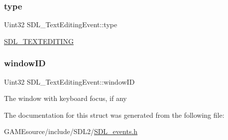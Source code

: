\subsubsection{\texorpdfstring{type}{type}}
{\footnotesize\ttfamily Uint32 S\+D\+L\+\_\+\+Text\+Editing\+Event\+::type}

\mbox{\hyperlink{_s_d_l__events_8h_a3b589e89be6b35c02e0dd34a55f3fccaa1b80c465df69c0b6d06f026ce7a230e3}{S\+D\+L\+\_\+\+T\+E\+X\+T\+E\+D\+I\+T\+I\+NG}} \mbox{\label{struct_s_d_l___text_editing_event_a23b3e414cf7a7ccc547b7595ca930049}} 
\subsubsection{\texorpdfstring{window\+ID}{windowID}}
{\footnotesize\ttfamily Uint32 S\+D\+L\+\_\+\+Text\+Editing\+Event\+::window\+ID}

The window with keyboard focus, if any 

The documentation for this struct was generated from the following file\+:\begin{DoxyCompactItemize}
\item 
G\+A\+M\+Esource/include/\+S\+D\+L2/\mbox{\hyperlink{_s_d_l__events_8h}{S\+D\+L\+\_\+events.\+h}}\end{DoxyCompactItemize}
